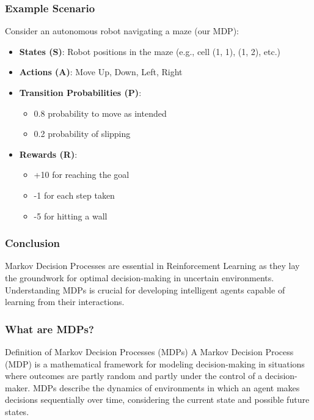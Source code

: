 \documentclass[aspectratio=169]{beamer}
\begin{document}
\begin{frame}[fragile]
    \frametitle{Example Scenario}
    Consider an autonomous robot navigating a maze (our MDP):
    \begin{itemize}
        \item \textbf{States (S)}: Robot positions in the maze (e.g., cell (1, 1), (1, 2), etc.)
        \item \textbf{Actions (A)}: Move Up, Down, Left, Right
        \item \textbf{Transition Probabilities (P)}: 
              \begin{itemize}
                  \item 0.8 probability to move as intended 
                  \item 0.2 probability of slipping
              \end{itemize}
        \item \textbf{Rewards (R)}: 
              \begin{itemize}
                  \item +10 for reaching the goal
                  \item -1 for each step taken
                  \item -5 for hitting a wall
              \end{itemize}
    \end{itemize}
\end{frame}

\begin{frame}[fragile]
    \frametitle{Conclusion}
    Markov Decision Processes are essential in Reinforcement Learning as they lay the groundwork for optimal decision-making in uncertain environments. Understanding MDPs is crucial for developing intelligent agents capable of learning from their interactions.
\end{frame}

\begin{frame}[fragile]
    \frametitle{What are MDPs?}
    \begin{block}{Definition of Markov Decision Processes (MDPs)}
        A Markov Decision Process (MDP) is a mathematical framework for modeling decision-making in situations where outcomes are partly random and partly under the control of a decision-maker. 
        MDPs describe the dynamics of environments in which an agent makes decisions sequentially over time, considering the current state and possible future states.
    \end{block}
\end{frame}
\end{document}
